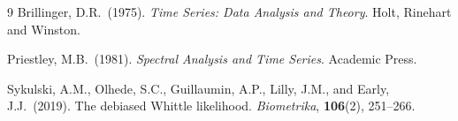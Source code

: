 \documentclass[12pt]{article}
\theoremstyle{definition}
\begin{document}
\bigskip
\begin{thebibliography}{9}
Brillinger, D.R.\ (1975).
\emph{Time Series: Data Analysis and Theory}.
Holt, Rinehart and Winston.

Priestley, M.B.\ (1981).
\emph{Spectral Analysis and Time Series}.
Academic Press.

Sykulski, A.M., Olhede, S.C., Guillaumin, A.P., Lilly, J.M., and Early, J.J.\
(2019).
The debiased Whittle likelihood.
\emph{Biometrika}, \textbf{106}(2), 251--266.
\end{thebibliography}
\end{document}
